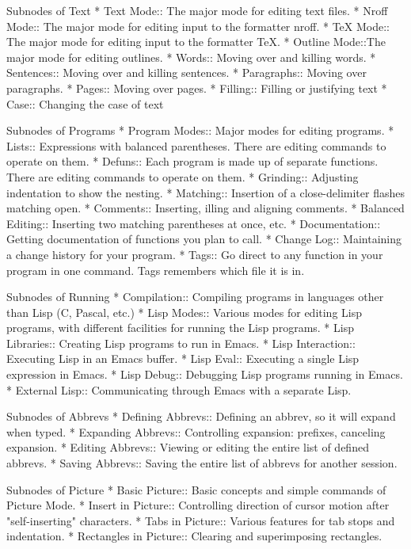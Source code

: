 Subnodes of Text
* Text Mode::   The major mode for editing text files.
* Nroff Mode::  The major mode for editing input to the formatter nroff.
* TeX Mode::    The major mode for editing input to the formatter TeX.
* Outline Mode::The major mode for editing outlines.
* Words::       Moving over and killing words.
* Sentences::   Moving over and killing sentences.
* Paragraphs::	Moving over paragraphs.
* Pages::	Moving over pages.
* Filling::     Filling or justifying text
* Case::        Changing the case of text

Subnodes of Programs
* Program Modes::       Major modes for editing programs.
* Lists::       Expressions with balanced parentheses.
                 There are editing commands to operate on them.
* Defuns::      Each program is made up of separate functions.
                 There are editing commands to operate on them.
* Grinding::    Adjusting indentation to show the nesting.
* Matching::    Insertion of a close-delimiter flashes matching open.
* Comments::    Inserting, illing and aligning comments.
* Balanced Editing::    Inserting two matching parentheses at once, etc.
* Documentation::       Getting documentation of functions you plan to call.
* Change Log::  Maintaining a change history for your program.
* Tags::        Go direct to any function in your program in one
                 command.  Tags remembers which file it is in.

Subnodes of Running
* Compilation::       Compiling programs in languages other than Lisp
                       (C, Pascal, etc.)
* Lisp Modes::        Various modes for editing Lisp programs, with
                       different facilities for running the Lisp programs.
* Lisp Libraries::    Creating Lisp programs to run in Emacs.
* Lisp Interaction::  Executing Lisp in an Emacs buffer.
* Lisp Eval::         Executing a single Lisp expression in Emacs.
* Lisp Debug::        Debugging Lisp programs running in Emacs.
* External Lisp::     Communicating through Emacs with a separate Lisp.

Subnodes of Abbrevs
* Defining Abbrevs::  Defining an abbrev, so it will expand when typed.
* Expanding Abbrevs:: Controlling expansion: prefixes, canceling expansion.
* Editing Abbrevs::   Viewing or editing the entire list of defined abbrevs.
* Saving Abbrevs::    Saving the entire list of abbrevs for another session.

Subnodes of Picture
* Basic Picture::     Basic concepts and simple commands of Picture Mode.
* Insert in Picture:: Controlling direction of cursor motion
                       after "self-inserting" characters.
* Tabs in Picture::   Various features for tab stops and indentation.
* Rectangles in Picture:: Clearing and superimposing rectangles.

